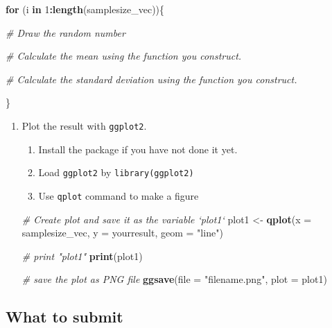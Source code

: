 \documentclass[]{book}
\newenvironment{Shaded}{\begin{snugshade}}{\end{snugshade}}
\newcommand{\KeywordTok}[1]{\textcolor[rgb]{0.13,0.29,0.53}{\textbf{#1}}}
\newcommand{\DataTypeTok}[1]{\textcolor[rgb]{0.13,0.29,0.53}{#1}}
\newcommand{\DecValTok}[1]{\textcolor[rgb]{0.00,0.00,0.81}{#1}}
\newcommand{\StringTok}[1]{\textcolor[rgb]{0.31,0.60,0.02}{#1}}
\newcommand{\CommentTok}[1]{\textcolor[rgb]{0.56,0.35,0.01}{\textit{#1}}}
\newcommand{\ControlFlowTok}[1]{\textcolor[rgb]{0.13,0.29,0.53}{\textbf{#1}}}
\newcommand{\OperatorTok}[1]{\textcolor[rgb]{0.81,0.36,0.00}{\textbf{#1}}}
\newcommand{\NormalTok}[1]{#1}
\providecommand{\tightlist}{%
  \setlength{\itemsep}{0pt}\setlength{\parskip}{0pt}}
\begin{document}
\begin{Shaded}
\begin{Highlighting}[]
\ControlFlowTok{for}\NormalTok{ (i }\ControlFlowTok{in} \DecValTok{1}\OperatorTok{:}\KeywordTok{length}\NormalTok{(samplesize_vec))\{}
  
  \CommentTok{# Draw the random number}
  
  \CommentTok{# Calculate the mean using the function you construct. }
  
  \CommentTok{# Calculate the standard deviation using the function you construct.}
  
\NormalTok{\}}
\end{Highlighting}
\end{Shaded}

\begin{enumerate}
\def\labelenumi{\arabic{enumi}.}
\setcounter{enumi}{4}
\tightlist
\item
  Plot the result with \texttt{ggplot2}.

  \begin{enumerate}
  \def\labelenumii{\arabic{enumii}.}
  \tightlist
  \item
    Install the package if you have not done it yet.
  \item
    Load \texttt{ggplot2} by \texttt{library(ggplot2)}
  \item
    Use \texttt{qplot} command to make a figure
  \end{enumerate}

\begin{Shaded}
\begin{Highlighting}[]
\CommentTok{# Create plot and save it as the variable `plot1`}
\NormalTok{plot1 <-}\StringTok{ }\KeywordTok{qplot}\NormalTok{(}\DataTypeTok{x =}\NormalTok{ samplesize_vec, }\DataTypeTok{y =}\NormalTok{ yourresult, }\DataTypeTok{geom =} \StringTok{"line"}\NormalTok{)}

\CommentTok{# print "plot1"}
\KeywordTok{print}\NormalTok{(plot1)}

\CommentTok{# save the plot as PNG file}
\KeywordTok{ggsave}\NormalTok{(}\DataTypeTok{file =} \StringTok{"filename.png"}\NormalTok{, }\DataTypeTok{plot =}\NormalTok{ plot1)}
\end{Highlighting}
\end{Shaded}
\end{enumerate}

\subsection{What to submit}\label{what-to-submit}
\end{document}
